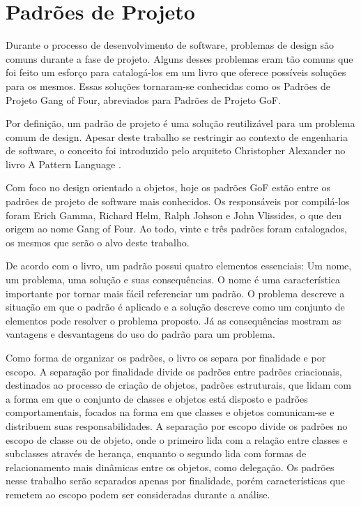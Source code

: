 \chapter{Padrões de Projeto}

Durante o processo de desenvolvimento de software, 
problemas de design são comuns durante a 
fase de projeto. Alguns desses problemas 
eram tão comuns que foi feito um esforço para catalogá-los 
em um livro \cite{gamma:1995} que oferece possíveis soluções para os mesmos. 
Essas soluções tornaram-se conhecidas como 
os Padrões de Projeto Gang of Four, abreviados 
para Padrões de Projeto GoF.

Por definição, um padrão de projeto é uma solução 
reutilizável para um problema comum de design. Apesar 
deste trabalho se restringir ao contexto de engenharia 
de software, o conceito foi introduzido pelo arquiteto 
Christopher Alexander no livro A Pattern Language 
\cite{alexanderpatternlanguage}.

Com foco no design orientado a objetos, hoje os 
padrões GoF estão entre os padrões de 
projeto de software mais conhecidos. Os responsáveis 
por compilá-los foram Erich Gamma, Richard Helm, 
Ralph Johson e John Vlissides, o que deu origem ao 
nome Gang of Four. Ao todo, vinte e três 
padrões foram catalogados, os mesmos que serão o alvo 
deste trabalho.

De acordo com o livro, um padrão possui quatro elementos 
essenciais: Um nome, um problema, uma solução e suas 
consequências. O nome é uma característica importante 
por tornar mais fácil referenciar um padrão. O problema 
descreve a situação em que o padrão é aplicado e 
a solução descreve como um conjunto de elementos pode 
resolver o problema proposto. Já as consequências 
mostram as vantagens e desvantagens do uso do padrão 
para um problema.

Como forma de organizar os padrões, o livro os separa 
por finalidade e por escopo. A separação por finalidade 
divide os padrões entre padrões criacionais, 
destinados ao processo de criação de objetos, padrões 
estruturais, que lidam com a forma em que o conjunto de 
classes e objetos está disposto e padrões comportamentais, 
focados na forma em que classes e objetos comunicam-se 
e distribuem suas responsabilidades. A separação por 
escopo divide os padrões no escopo de classe ou de objeto, 
onde o primeiro lida com a relação entre classes e 
subclasses através de herança, enquanto o segundo lida 
com formas de relacionamento mais dinâmicas entre os 
objetos, como delegação. Os padrões nesse trabalho 
serão separados apenas por finalidade, porém 
características que remetem ao escopo 
podem ser consideradas durante a análise.


